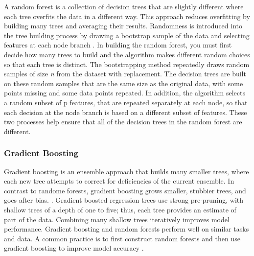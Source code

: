 \documentclass[sigconf]{acmart}
\begin{document}
A random forest is a collection of decision trees that are slightly different 
where each tree overfits the data in a different way. This approach reduces 
overfitting by building many trees and averaging their results. Randomness is 
introduced into the tree building process by drawing a bootstrap sample of the 
data and selecting features at each node branch \cite{muller17, raschka17}. 
In building the random forest, you must first decide how many trees to build  
and the algorithm makes different random choices so that each tree is distinct. 
The bootstrapping method repeatedly draws random samples of size \textit{n} 
from the dataset with replacement. The decision trees are built on these 
random samples that are the same size as the original data, with some points 
missing and some data points repeated. In addition, the algorithm selects a 
random subset of p features, that are repeated separately at each node, so 
that each decision at the node branch is based on a different subset of 
features. These two processes help ensure that all of the decision trees in 
the random forest are different. 


\subsubsection{Gradient Boosting}

Gradient boosting is an ensemble approach that builds many smaller trees,  
where each new tree attempts to correct for deficiencies of the current 
ensemble. In contrast to randome forests, gradient boosting grows smaller, 
stubbier trees, and goes after bias. \cite{jamesetal13, kuhn13}. Gradient 
boosted regression trees use strong pre-pruning, with shallow trees of a 
depth of one to five; thus, each tree provides an estimate of part of the 
data. Combining many shallow trees iteratively improves model performance. 
Gradient boosting and random forests perform well on similar tasks and data. 
A common practice is to first construct random forests and then use gradient 
boosting to improve model accuracy \cite{muller17}. 

\end{document}
